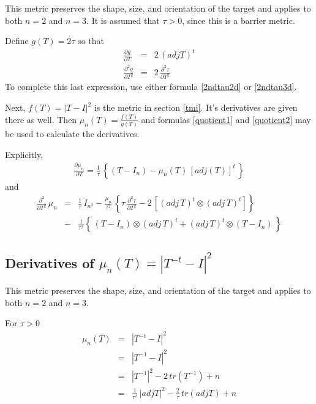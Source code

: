 \documentclass{report}
\begin{document}
\noindent This metric preserves the shape, size, and orientation of the target
and applies to both $n=2$ and $n=3$. It is assumed that $\tau>0$, since 
this is a barrier metric. \newline

\noindent Define $g(T)=2 \tau$ so that
\begin{eqnarray}
\frac{\partial g}{\partial T} & = & 2 \, (adj T)^t \\
\frac{\partial^2 g}{\partial T^2} & = & 2 \, \frac{\partial^2 \tau}{\partial T^2}
\end{eqnarray}
To complete this last expression, use either formula \ref{2ndtau2d} or \ref{2ndtau3d}. \newline

\noindent Next, $f(T)=|T-I|^2$ is the metric in section \ref{tmi}. It's
derivatives are given there as well. Then $\mu_n(T) = \frac{f(T)}{g(T)}$ 
and formulas \ref{quotient1} and \ref{quotient2} may be used to calculate the derivatives.  \newline

\noindent Explicitly, 
\begin{eqnarray}
\frac{\partial \mu_n}{\partial T} = \frac{1}{\tau} \, \left\{ \left( T - I_n \right) - \mu_n(T) \, \left[ adj(T) \right]^t \, \right\}
\end{eqnarray}
and 
\begin{eqnarray}
\frac{\partial^2}{\partial T^2} \, \mu_n & = & \frac{1}{\tau} \, I_{n^2} - \frac{\mu_n}{\tau^2} \, \left\{ \tau \, \frac{\partial^2 \tau}{\partial T^2} - 2 \, \left[ (adj \, T)^t \otimes (adj \, T)^t \right] \right\} \nonumber \\
 & - & \frac{1}{\tau^2} \left\{ \, (T-I_n) \otimes (adj \, T)^t + (adj \, T)^t \otimes (T-I_n) \, \right\}
\end{eqnarray}

\subsection{Derivatives of $\mu_n(T)=|T^{-t}-I|^2$ \label{sso+2}}

\noindent This metric preserves the shape, size, and orientation of the target
and applies to both $n=2$ and $n=3$. \newline

\noindent For $\tau>0$
\begin{eqnarray}
\mu_n (T) & = & |T^{-t}-I|^2 \\
          & = & |T^{-1}-I|^2  \\
          & = & |T^{-1}|^2 - 2 \, tr(T^{-1}) + n \\
          & = & \frac{1}{\tau^2} \, |adj T|^2 - \frac{2}{\tau} \, tr(adj T) + n
\end{eqnarray}
\end{document}
